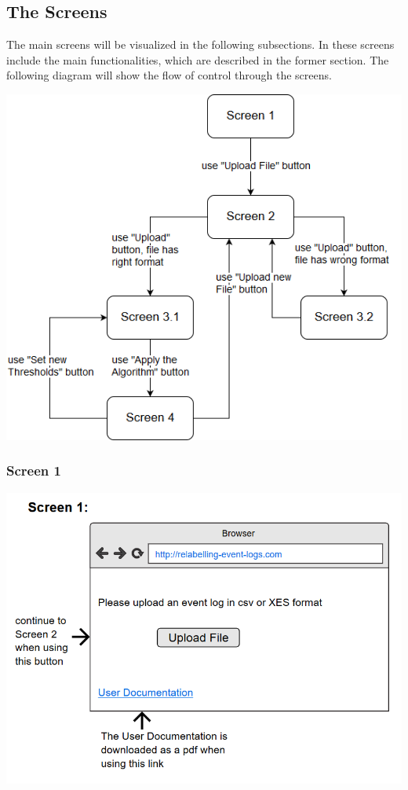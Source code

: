 \documentclass[notitlepage]{article}
\begin{document}
\begin{flushleft}
\subsection{The Screens}

The main screens will be visualized in the following subsections. In these screens include the main functionalities, which are described in the former section. The following diagram will show the flow of control through the screens.  

\includegraphics[scale=0.7]{ScreenFlow.png}

\subsubsection{Screen 1}

\includegraphics[scale=0.8]{InterfaceMockup1.png}



\end{flushleft}
\end{document}
